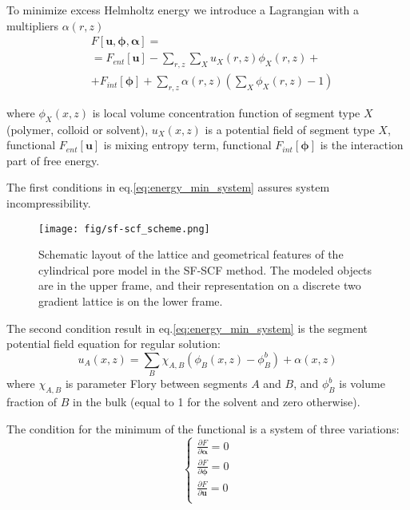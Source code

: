 \documentclass[10pt, a4paper]{article}
\begin{document}
\begin{multicols}{2}
To minimize excess Helmholtz energy we introduce a Lagrangian with a multipliers $\alpha(r,z)$
\begin{equation}
    \label{eq:fe_lagrangian}
    \begin{aligned}
    &F[\mathbf{u}, \boldsymbol{\phi}, \boldsymbol{\alpha}] =\\
    &= F_{ent}[\mathbf{u}] - \sum\limits_{r,z} \sum\limits_X u_X(r, z) \phi_X(r, z) + \\
    &+ F_{int} [\boldsymbol{\phi}] 
    + \sum\limits_{r,z} \alpha(r, z) \left( \sum\limits_X \phi_X(r, z) - 1 \right)
    \end{aligned} 
\end{equation}

where $\phi_X(x, z)$ is local volume concentration function of segment type $X$ (polymer, colloid or solvent), $u_X(x, z)$ is a potential field of segment type $X$, functional $F_{ent}[\mathbf{u}]$ is mixing entropy term, functional $F_{int} [\boldsymbol{\phi}]$ is the interaction part of free energy. 


The first conditions in eq.\ref{eq:energy_min_system} assures system incompressibility.

\begin{figure}[H]
    \centering
    \texttt{[image: fig/sf-scf\_scheme.png]}
    \caption{
    Schematic layout of the lattice and geometrical features of the cylindrical pore model in the SF-SCF method.
    The modeled objects are in the upper frame, and their representation on a discrete two gradient lattice is on the lower frame.
    }
\label{fig:sf-scf_scheme}
\end{figure}


The second condition result in eq.\ref{eq:energy_min_system} is the segment potential field equation for regular solution:
\begin{equation}
    \label{eq:u-phi}
    u_A(x, z) =\sum\limits_{B} \chi_{A,B} \left(\phi_B(x,z) - \phi_B^b \right) + \alpha(x, z)
\end{equation}
where $\chi_{A,B}$ is parameter Flory between segments $A$ and $B$, and $\phi_B^b$ is volume fraction of $B$ in the bulk (equal to 1 for the solvent and zero otherwise).


The condition for the minimum of the functional is a system of three variations:
\begin{equation}
    \label{eq:energy_min_system}
    \begin{cases}
        \frac{\partial F}{\partial \boldsymbol{\alpha}} = 0 \\
        \frac{\partial F}{\partial \boldsymbol{\phi}} = 0 \\
        \frac{\partial F}{\partial \mathbf{u}} = 0 \\
    \end{cases}
\end{equation}


\end{multicols}
\end{document}
